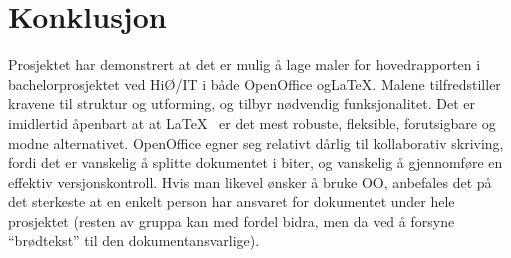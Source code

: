 \cleardoublepage
\chapter{Konklusjon}
\label{chap:conclusion} 

Prosjektet har demonstrert at det er mulig å lage maler for hovedrapporten i bachelorprosjektet ved HiØ/IT i både OpenOffice og\LaTeX. Malene tilfredstiller kravene til struktur og utforming, og tilbyr nødvendig funksjonalitet. Det er imidlertid åpenbart at at \LaTeX~ er det mest robuste, fleksible, forutsigbare  og modne alternativet. OpenOffice egner seg relativt dårlig til kollaborativ skriving, fordi det er vanskelig å splitte dokumentet i biter, og vanskelig å gjennomføre en effektiv versjonskontroll. Hvis man likevel ønsker å bruke OO, anbefales det på det sterkeste at en enkelt person har ansvaret for dokumentet under hele prosjektet (resten av gruppa kan med fordel bidra, men da ved å forsyne ``brødtekst'' til den dokumentansvarlige).

\lipsum[42]

